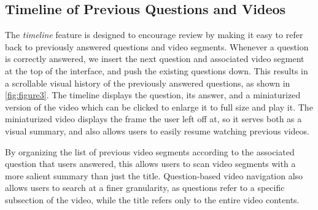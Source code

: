 \documentclass{chi-ext}
\begin{document}

\subsection{Timeline of Previous Questions and Videos}

The \emph{timeline} feature is designed to encourage review by making it easy to refer back to previously answered questions and video segments. Whenever a question is correctly answered, we insert the next question and associated video segment at the top of the interface, and push the existing questions down. This results in a scrollable visual history of the previously answered questions, as shown in \autoref{fig:figure3}. The timeline displays the question, its answer, and a miniaturized version of the video which can be clicked to enlarge it to full size and play it. The miniaturized video displays the frame the user left off at, so it serves both as a visual summary, and also allows users to easily resume watching previous videos.%

By organizing the list of previous video segments according to the associated question that users answered, this allows users to scan video segments with a more salient summary than just the title. Question-based video navigation also allows users to search at a finer granularity, as questions refer to a specific subsection of the video, while the title refers only to the entire video contents.

\end{document}

